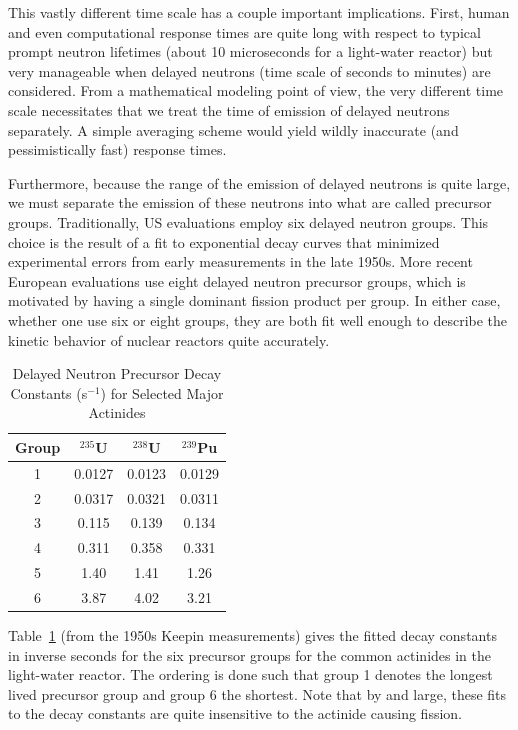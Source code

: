 This vastly different time scale has a couple important implications. First, human and even computational response times are quite long with respect to typical prompt neutron lifetimes (about 10 microseconds for a light-water reactor) but very manageable when delayed neutrons (time scale of seconds to minutes) are considered. From a mathematical modeling point of view, the very different time scale necessitates that we treat the time of emission of delayed neutrons separately. A simple averaging scheme would yield wildly inaccurate (and pessimistically fast) response times.

Furthermore, because the range of the emission of delayed neutrons is quite large, we must separate the emission of these neutrons into what are called precursor groups. Traditionally, US evaluations employ six delayed neutron groups. This choice is the result of a fit to exponential decay curves that minimized experimental errors from early measurements in the late 1950s. More recent European evaluations use eight delayed neutron precursor groups, which is motivated by having a single dominant fission product per group. In either case, whether one use six or eight groups, they are both fit well enough to describe the kinetic behavior of nuclear reactors quite accurately.

\begin{table}[tb!]
\caption{Delayed Neutron Precursor Decay Constants (s$^{-1}$) for Selected Major Actinides}
\begin{center}
\begin{tabular}{|c|c|c|c|} \hline
  Group	& $^{235}$U			& $^{238}$U			& $^{239}$Pu		\\ \hline
  1		& 0.0127			& 0.0123			& 0.0129			\\
  2		& 0.0317			& 0.0321			& 0.0311			\\
  3		& 0.115				& 0.139				& 0.134				\\
  4		& 0.311				& 0.358				& 0.331				\\
  5		& 1.40				& 1.41				& 1.26				\\
  6		& 3.87				& 4.02				& 3.21				\\ \hline
\end{tabular}
\end{center}
\label{Table:kinetics_delayedPrecursorDecayConstants}
\end{table}%

Table~\ref{Table:kinetics_delayedPrecursorDecayConstants} (from the 1950s Keepin measurements) gives the fitted decay constants in inverse seconds for the six precursor groups for the common actinides in the light-water reactor. The ordering is done such that group 1 denotes the longest lived precursor group and group 6 the shortest. Note that by and large, these fits to the decay constants are quite insensitive to the actinide causing fission.

